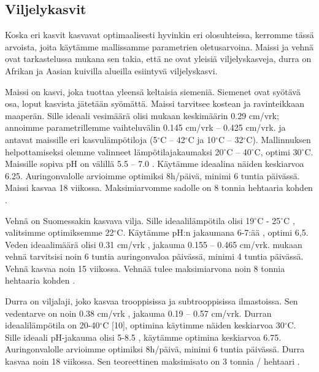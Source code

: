 \documentclass[12pt]{scrreprt}
\begin{document}
  \subsection{Viljelykasvit}

  Koska eri kasvit kasvavat optimaalisesti hyvinkin eri olosuhteissa, kerromme tässä arvoista, joita käytämme mallissamme parametrien oletusarvoina. Maissi ja vehnä ovat tarkastelussa mukana sen takia, että ne ovat yleisiä viljelyskasveja, durra on Afrikan ja Aasian kuivilla alueilla esiintyvä viljelyskasvi.  
  
  Maissi on kasvi, joka tuottaa yleensä keltaisia siemeniä. Siemenet ovat
  syötävä osa, loput kasvista jätetään syömättä. Maissi tarvitsee kostean ja
  ravinteikkaan maaperän. Sille ideaali vesimäärä olisi \cite{cropwater} mukaan
  keskimäärin 0.29 cm/vrk; annoimme parametrillemme vaihteluvälin 0.145 cm/vrk
  – 0.425 cm/vrk. \cite{ugandamaize} ja \cite{plessismaize} antavat maissille
  eri kasvulämpötiloja (5$^{\circ}$C – 42$^{\circ}$C ja 10$^{\circ}$C –
  32$^{\circ}$C). Mallinnuksen helpottamiseksi olemme valinneet
  lämpötilajakaumaksi 20$^{\circ}$C – 40$^{\circ}$C, optimi 30$^{\circ}$C.
  Maissille sopiva pH on välillä 5.5 – 7.0 \cite{corngrowing}. Käytämme
  ideaalina näiden keskiarvoa 6.25. Auringonvalolle arvioimme optimiksi
  8h/päivä, minimi 6 tuntia päivässä. Maissi kasvaa 18 viikossa.
  Maksimiarvomme sadolle on 8 tonnia hehtaaria kohden \cite{iita}.

  Vehnä on Suomessakin kasvava vilja. Sille ideaalilämpötila olisi 19$^{\circ}$C
  - 25$^{\circ}$C \cite{wheat}, valitsimme optimiksemme 22$^{\circ}$C. Käytämme
  pH:n jakaumana 6-7:ää \cite{wheatfert}, optimi 6,5. Veden ideaalimäärä olisi
  0.31 cm/vrk \cite{cropwater}, jakauma  0.155 – 0.465 cm/vrk. \cite{growwheat}
  mukaan vehnä tarvitsisi noin 6 tuntia auringonvaloa päivässä, minimi 4 tuntia 
  päivässä. Vehnä kasvaa noin 15 viikossa. Vehnää tulee maksimiarvona noin 8 tonnia 
  hehtaaria kohden \cite{sri}.

  Durra on viljalaji, joko kasvaa trooppisissa ja subtrooppisissa ilmastoissa.
  Sen vedentarve on noin 0.38 cm/vrk \cite{cropwater}, jakauma 0.19 –
  0.57 cm/vrk. Durran ideaalilämpötila on 20-40$^{\circ}$C [10], optimina
  käytimme näiden keskiarvoa 30$^{\circ}$C. Sille ideaali pH-jakauma olisi 5-8.5
  \cite{moench}, käytämme optimina keskiarvoa 6.75. Auringonvalolle arvioimme
  optimiksi 8h/päivä, minimi 6 tuntia päivässä. Durra kasvaa noin 18
  viikossa. Sen teoreettinen maksimisato on 3 tonnia / hehtaari \cite{wylie}.
\end{document}
